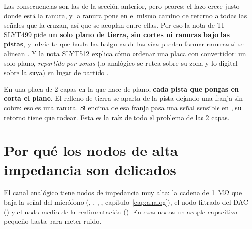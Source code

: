 Las consecuencias son las de la sección anterior, pero peores: el lazo crece justo donde está la ranura, y la ranura
pone en el mismo camino de retorno a todas las señales que la cruzan, así que se acoplan entre ellas. Por eso la nota
de TI SLYT499 pide \textbf{un solo plano de tierra, sin cortes ni ranuras bajo las pistas}, y advierte que hasta las
holguras de las vías pueden formar ranuras si se alinean . Y la nota SLYT512 explica cómo ordenar una
placa con convertidor: un solo plano, \emph{repartido por zonas} (lo analógico se rutea sobre su zona y lo digital
sobre la suya) en lugar de partido .

\begin{ojo}
En una placa de 2 capas en la que  hace de plano, \textbf{cada pista que pongas en  corta el
plano}. El relleno de tierra se aparta de la pista dejando una franja sin cobre: eso es una ranura. Si encima de esa
franja pasa una señal sensible en , su retorno tiene que rodear. Esta es la raíz de todo el problema de las
2 capas.
\end{ojo}

\section{Por qué los nodos de alta impedancia son delicados}\label{sec:c08-altaz}

El canal analógico tiene nodos de impedancia muy alta: la cadena de \SI{1}{\mega\ohm} que baja la señal del micrófono
(, , , , capítulo~\ref{cap:analog}), el nodo filtrado del DAC () y el
nodo medio de la realimentación (). En esos nodos un acople capacitivo pequeño basta para meter ruido.

